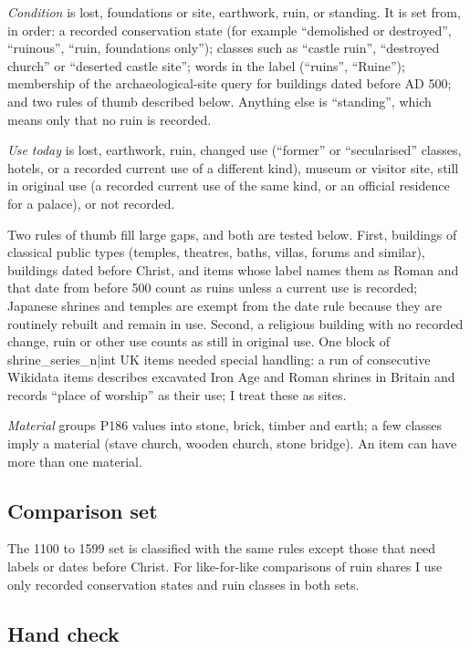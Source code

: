 \documentclass[11pt,a4paper]{article}
\begin{document}
\emph{Condition} is lost, foundations or site, earthwork, ruin, or standing. It is set from, in order: a recorded conservation state (for example ``demolished or destroyed'', ``ruinous'', ``ruin, foundations only''); classes such as ``castle ruin'', ``destroyed church'' or ``deserted castle site''; words in the label (``ruins'', ``Ruine''); membership of the archaeological-site query for buildings dated before AD 500; and two rules of thumb described below. Anything else is ``standing'', which means only that no ruin is recorded.

\emph{Use today} is lost, earthwork, ruin, changed use (``former'' or ``secularised'' classes, hotels, or a recorded current use of a different kind), museum or visitor site, still in original use (a recorded current use of the same kind, or an official residence for a palace), or not recorded.

Two rules of thumb fill large gaps, and both are tested below. First, buildings of classical public types (temples, theatres, baths, villas, forums and similar), buildings dated before Christ, and items whose label names them as Roman and that date from before 500 count as ruins unless a current use is recorded; Japanese shrines and temples are exempt from the date rule because they are routinely rebuilt and remain in use. Second, a religious building with no recorded change, ruin or other use counts as still in original use. One block of {{shrine_series_n|int}} UK items needed special handling: a run of consecutive Wikidata items describes excavated Iron Age and Roman shrines in Britain and records ``place of worship'' as their use; I treat these as sites.

\emph{Material} groups P186 values into stone, brick, timber and earth; a few classes imply a material (stave church, wooden church, stone bridge). An item can have more than one material.

\subsection{Comparison set}

The 1100 to 1599 set is classified with the same rules except those that need labels or dates before Christ. For like-for-like comparisons of ruin shares I use only recorded conservation states and ruin classes in both sets.

\subsection{Hand check}
\end{document}
